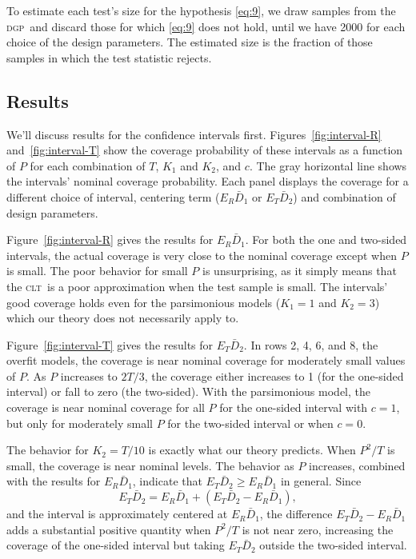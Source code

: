 \documentclass[11pt]{article}
\newcommand{\clt}{\textsc{clt}}
\newcommand{\dgp}{\textsc{dgp}}
\begin{document}
To estimate each test's size for the hypothesis \eqref{eq:9}, we draw
samples from the \dgp\ and discard those for which \eqref{eq:9} does
not hold, until we have 2000 for each choice of the design parameters.
The estimated size is the fraction of those samples in which the test
statistic rejects.
\subsection{Results}
We'll discuss results for the confidence intervals first.
Figures~\ref{fig:interval-R} and~\ref{fig:interval-T} show the
coverage probability of these intervals as a function of $P$ for each
combination of $T$, $K_1$ and $K_2$, and $c$.  The gray horizontal
line shows the intervals' nominal coverage probability.  Each panel
displays the coverage for a different choice of interval, centering
term ($E_R \bar D_1$ or $E_T \bar D_2$) and combination of design
parameters.

Figure~\ref{fig:interval-R} gives the results for $E_R \bar D_1$.  For
both the one and two-sided intervals, the actual coverage is very
close to the nominal coverage except when $P$ is small.  The poor
behavior for small $P$ is unsurprising, as it simply means that the
\clt\ is a poor approximation when the test sample is small.  The
intervals' good coverage holds even for the parsimonious models
($K_1=1$ and $K_2= 3$) which our theory does not necessarily apply to.

Figure~\ref{fig:interval-T} gives the results for $E_T \bar D_2$.  In
rows 2, 4, 6, and 8, the overfit models, the coverage is near nominal
coverage for moderately small values of $P$.  As $P$ increases to $2T/3$, the
coverage either increases to 1 (for the one-sided interval) or fall to
zero (the two-sided).  With the parsimonious model, the coverage is near
nominal coverage for all $P$ for the one-sided interval with $c=1$,
but only for moderately small $P$ for the two-sided interval or when
$c=0$.

The behavior for $K_2 = T/10$ is exactly what our theory predicts.
When $P^2/T$ is small, the coverage is near nominal levels.  The
behavior as $P$ increases, combined with the results for $E_R
\bar{D}_1$, indicate that $E_T \bar D_2 \geq E_R \bar D_1$ in general.
Since
\[E_{T} \bar D_2 = E_{R} \bar D_1 + (E_{T} \bar D_2 - E_{R} \bar
D_1), \] and the interval is approximately centered at $E_R \bar D_1$,
the difference $E_{T} \bar D_2 - E_{R} \bar D_1$ adds a substantial
positive quantity when $P^2/T$ is not near zero, increasing the
coverage of the one-sided interval but taking $E_T \bar D_2$ outside
the two-sided interval.
\end{document}
